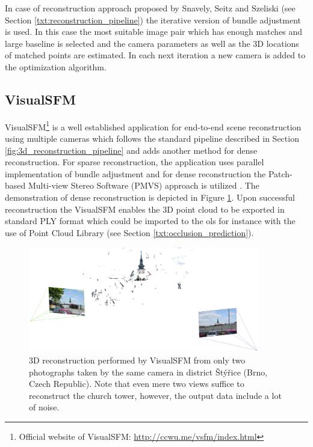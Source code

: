 In case of reconstruction approach proposed by Snavely, Seitz and Szeliski \cite{Snavely:2006:PTE:1179352.1141964} (see Section \ref{txt:reconstruction_pipeline}) the iterative version of bundle adjustment is used. In this case the most suitable image pair which has enough matches and large baseline is selected and the camera parameters as well as the 3D locations of matched points are estimated. In each next iteration a new camera is added to the optimization algorithm.

\subsection{VisualSFM} \label{txt:visual_sfm}

VisualSFM\footnote{Official website of VisualSFM: \url{http://ccwu.me/vsfm/index.html}} is a well established application for end-to-end scene reconstruction using multiple cameras which follows the standard pipeline described in Section \ref{fig:3d_reconstruction_pipeline} and adds another method for dense reconstruction. For sparse reconstruction, the application uses parallel implementation of bundle adjustment \cite{ChangchangWu:2011:MBA:2191740.2191945} and for dense reconstruction the Patch-based Multi-view Stereo Software (PMVS) approach is utilized \cite{Furu:2010:PMVS}. The demonstration of dense reconstruction is depicted in Figure \ref{fig:visualsfm_tower}. Upon successful reconstruction the VisualSFM enables the 3D point cloud to be exported in standard PLY format which could be imported to the \gls{ols} for instance with the use of Point Cloud Library (see Section \ref{txt:occlusion_prediction}).

\begin{figure}[tbh]
	\centering
	\includegraphics[width=0.9\textwidth]{fig/visualsfm_tower.png}
	\caption{3D reconstruction performed by VisualSFM from only two photographs taken by the same camera in district Štýřice (Brno, Czech Republic). Note that even mere two views suffice to reconstruct the church tower, however, the output data include a lot of noise.}
	\label{fig:visualsfm_tower}
\end{figure}

